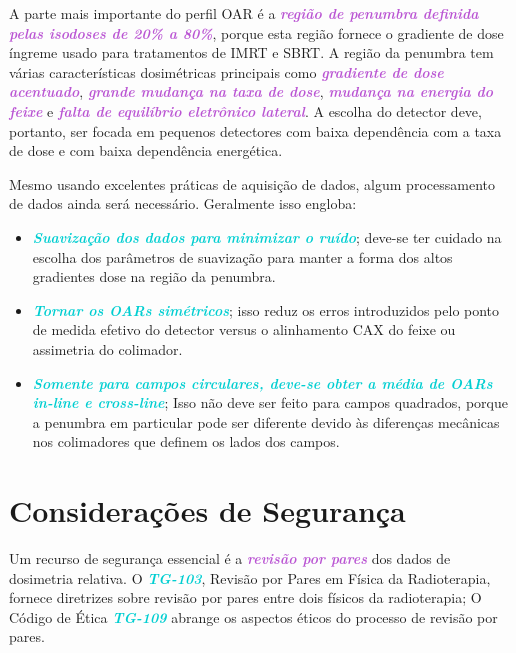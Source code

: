 \documentclass[11pt,a4paper]{article}
\begin{document}
	A parte mais importante do perfil OAR é a \textcolor{MediumOrchid}{\textbf{\textit{região de penumbra definida pelas isodoses de 20\% a 80\%}}}, porque esta região fornece o gradiente de dose íngreme usado para tratamentos de IMRT e SBRT. A região da penumbra tem várias características dosimétricas principais como \textcolor{MediumOrchid}{\textbf{\textit{gradiente de dose acentuado}}}, \textcolor{MediumOrchid}{\textbf{\textit{grande mudança na taxa de dose}}}, \textcolor{MediumOrchid}{\textbf{\textit{mudança na energia do feixe}}} e \textcolor{MediumOrchid}{\textbf{\textit{falta de equilíbrio eletrônico lateral}}}. A escolha do detector deve, portanto, ser focada em pequenos detectores com baixa dependência com a taxa de dose e com baixa dependência energética.

	Mesmo usando excelentes práticas de aquisição de dados, algum processamento de dados ainda será necessário. Geralmente isso engloba:

	\begin{itemize}[label=\textcolor{CarnationPink}{$\blacktriangleright$}]
		\item \textcolor{DarkTurquoise}{\textbf{\textit{Suavização dos dados para minimizar o ruído}}}; deve-se ter cuidado na escolha dos parâmetros de suavização para manter a forma dos altos gradientes dose na região da penumbra.
		\item \textcolor{DarkTurquoise}{\textbf{\textit{Tornar os OARs simétricos}}}; isso reduz os erros introduzidos pelo ponto de medida efetivo do detector versus o alinhamento CAX do feixe ou assimetria do colimador.
		\item \textcolor{DarkTurquoise}{\textbf{\textit{Somente para campos circulares, deve-se obter a média de OARs in-line e cross-line}}}; Isso não deve ser feito para campos quadrados, porque a penumbra em particular pode ser diferente devido às diferenças mecânicas nos colimadores que definem os lados dos campos.
	\end{itemize}

\section{Considerações de Segurança}

	Um recurso de segurança essencial é a \textcolor{MediumOrchid}{\textbf{\textit{revisão por pares}}} dos dados de dosimetria relativa. O \textcolor{DarkTurquoise}{\textbf{\textit{TG-103}}}, Revisão por Pares em Física da Radioterapia, fornece diretrizes sobre revisão por pares entre dois físicos da radioterapia; O Código de Ética \textcolor{DarkTurquoise}{\textbf{\textit{TG-109}}} abrange os aspectos éticos do processo de revisão por pares.
\end{document}
